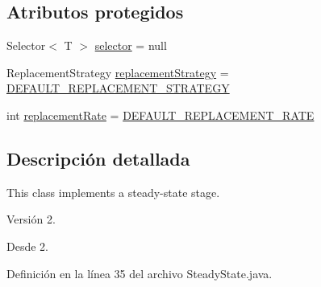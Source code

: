 \subsection*{Atributos protegidos}
\begin{DoxyCompactItemize}
\item 
Selector$<$ T $>$ \hyperlink{classjenes_1_1stage_1_1operator_1_1common_1_1_steady_state_3_01_t_01extends_01_chromosome_01_4_a83a734a69acdc4ee13d42982a43e8ba1}{selector} = null
\item 
Replacement\-Strategy \hyperlink{classjenes_1_1stage_1_1operator_1_1common_1_1_steady_state_3_01_t_01extends_01_chromosome_01_4_a4d727adbb35eaad5d78fc59abaabea0c}{replacement\-Strategy} = \hyperlink{classjenes_1_1stage_1_1operator_1_1common_1_1_steady_state_3_01_t_01extends_01_chromosome_01_4_a4ed786deaaaefebd47fffc18e99b3710}{D\-E\-F\-A\-U\-L\-T\-\_\-\-R\-E\-P\-L\-A\-C\-E\-M\-E\-N\-T\-\_\-\-S\-T\-R\-A\-T\-E\-G\-Y}
\item 
int \hyperlink{classjenes_1_1stage_1_1operator_1_1common_1_1_steady_state_3_01_t_01extends_01_chromosome_01_4_a84dd70ced0dad9433e4168f18eb735f9}{replacement\-Rate} = \hyperlink{classjenes_1_1stage_1_1operator_1_1common_1_1_steady_state_3_01_t_01extends_01_chromosome_01_4_a9700692d577e24267d1105f2a6e3d379}{D\-E\-F\-A\-U\-L\-T\-\_\-\-R\-E\-P\-L\-A\-C\-E\-M\-E\-N\-T\-\_\-\-R\-A\-T\-E}
\end{DoxyCompactItemize}


\subsection{Descripción detallada}
This class implements a steady-\/state stage.

\begin{DoxyVersion}{Versión}
2. 
\end{DoxyVersion}
\begin{DoxySince}{Desde}
2. 
\end{DoxySince}


Definición en la línea 35 del archivo Steady\-State.\-java.



